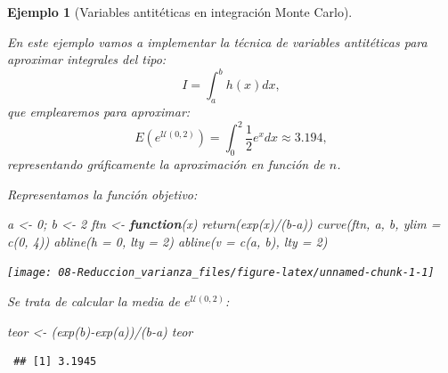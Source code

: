 \documentclass[
  10pt,
]{book}
\newenvironment{Shaded}{\begin{snugshade}}{\end{snugshade}}
\newcommand{\AttributeTok}[1]{\textcolor[rgb]{0.77,0.63,0.00}{#1}}
\newcommand{\ControlFlowTok}[1]{\textcolor[rgb]{0.13,0.29,0.53}{\textbf{#1}}}
\newcommand{\DecValTok}[1]{\textcolor[rgb]{0.00,0.00,0.81}{#1}}
\newcommand{\FunctionTok}[1]{\textcolor[rgb]{0.00,0.00,0.00}{#1}}
\newcommand{\NormalTok}[1]{#1}
\newcommand{\OtherTok}[1]{\textcolor[rgb]{0.56,0.35,0.01}{#1}}
\newcommand{\SpecialCharTok}[1]{\textcolor[rgb]{0.00,0.00,0.00}{#1}}
\theoremstyle{break}
\newtheorem{example}{Ejemplo}[chapter]
\theoremstyle{nonumberplain}
\begin{document}
\begin{example}[Variables antitéticas en integración Monte Carlo]
\protect\hypertarget{exm:integrala}{}\label{exm:integrala}

En este ejemplo vamos a implementar la técnica de variables antitéticas para aproximar integrales del tipo:
\[I=\int_{a}^{b}h\left(  x\right)  dx,\]
que emplearemos para aproximar:
\[E\left(  e^{\mathcal{U}(0,2)}\right)  =\int_{0}^{2}\frac{1}{2}e^{x}dx \approx 3.194,\]
representando gráficamente la aproximación en función de \(n\).

Representamos la función objetivo:

\begin{Shaded}
\begin{Highlighting}[]
\NormalTok{a }\OtherTok{\textless{}{-}} \DecValTok{0}\NormalTok{; b }\OtherTok{\textless{}{-}} \DecValTok{2}
\NormalTok{ftn }\OtherTok{\textless{}{-}} \ControlFlowTok{function}\NormalTok{(x) }\FunctionTok{return}\NormalTok{(}\FunctionTok{exp}\NormalTok{(x)}\SpecialCharTok{/}\NormalTok{(b}\SpecialCharTok{{-}}\NormalTok{a))}
\FunctionTok{curve}\NormalTok{(ftn, a, b, }\AttributeTok{ylim =} \FunctionTok{c}\NormalTok{(}\DecValTok{0}\NormalTok{, }\DecValTok{4}\NormalTok{))}
\FunctionTok{abline}\NormalTok{(}\AttributeTok{h =} \DecValTok{0}\NormalTok{, }\AttributeTok{lty =} \DecValTok{2}\NormalTok{)}
\FunctionTok{abline}\NormalTok{(}\AttributeTok{v =} \FunctionTok{c}\NormalTok{(a, b), }\AttributeTok{lty =} \DecValTok{2}\NormalTok{)}
\end{Highlighting}
\end{Shaded}

\begin{center}\texttt{[image: 08-Reduccion\_varianza\_files/figure-latex/unnamed-chunk-1-1]} \end{center}

Se trata de calcular la media de \(e^{\mathcal{U}(0,2)}\):

\begin{Shaded}
\begin{Highlighting}[]
\NormalTok{teor }\OtherTok{\textless{}{-}}\NormalTok{ (}\FunctionTok{exp}\NormalTok{(b)}\SpecialCharTok{{-}}\FunctionTok{exp}\NormalTok{(a))}\SpecialCharTok{/}\NormalTok{(b}\SpecialCharTok{{-}}\NormalTok{a)}
\NormalTok{teor}
\end{Highlighting}
\end{Shaded}

\begin{verbatim}
 ## [1] 3.1945
\end{verbatim}


\end{example}
\end{document}
